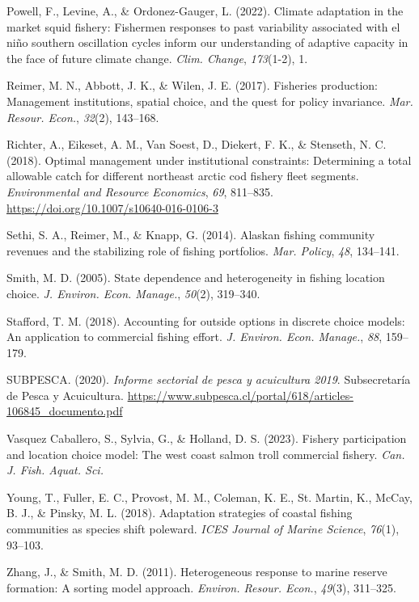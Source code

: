 \documentclass[
  11pt,
]{article}
\newlength{\cslhangindent}
\newenvironment{CSLReferences}[2] %
 {\begin{list}{}{%
  \setlength{\itemindent}{0pt}
  \setlength{\leftmargin}{0pt}
  \setlength{\parsep}{0pt}
  \ifodd #1
   \setlength{\leftmargin}{\cslhangindent}
   \setlength{\itemindent}{-1\cslhangindent}
  \fi
  \setlength{\itemsep}{#2\baselineskip}}}
 {\end{list}}
\begin{document}
\begin{CSLReferences}{1}{0}
Powell, F., Levine, A., \& Ordonez-Gauger, L. (2022). Climate adaptation
in the market squid fishery: Fishermen responses to past variability
associated with el niño southern oscillation cycles inform our
understanding of adaptive capacity in the face of future climate change.
\emph{Clim. Change}, \emph{173}(1-2), 1.

Reimer, M. N., Abbott, J. K., \& Wilen, J. E. (2017). Fisheries
production: Management institutions, spatial choice, and the quest for
policy invariance. \emph{Mar. Resour. Econ.}, \emph{32}(2), 143--168.

Richter, A., Eikeset, A. M., Van Soest, D., Diekert, F. K., \& Stenseth,
N. C. (2018). Optimal management under institutional constraints:
Determining a total allowable catch for different northeast arctic cod
fishery fleet segments. \emph{Environmental and Resource Economics},
\emph{69}, 811--835. \url{https://doi.org/10.1007/s10640-016-0106-3}

Sethi, S. A., Reimer, M., \& Knapp, G. (2014). Alaskan fishing community
revenues and the stabilizing role of fishing portfolios. \emph{Mar.
Policy}, \emph{48}, 134--141.

Smith, M. D. (2005). State dependence and heterogeneity in fishing
location choice. \emph{J. Environ. Econ. Manage.}, \emph{50}(2),
319--340.

Stafford, T. M. (2018). Accounting for outside options in discrete
choice models: An application to commercial fishing effort. \emph{J.
Environ. Econ. Manage.}, \emph{88}, 159--179.

SUBPESCA. (2020). \emph{Informe sectorial de pesca y acuicultura 2019}.
Subsecretaría de Pesca y Acuicultura.
\url{https://www.subpesca.cl/portal/618/articles-106845_documento.pdf}

Vasquez Caballero, S., Sylvia, G., \& Holland, D. S. (2023). Fishery
participation and location choice model: The west coast salmon troll
commercial fishery. \emph{Can. J. Fish. Aquat. Sci.}

Young, T., Fuller, E. C., Provost, M. M., Coleman, K. E., St. Martin,
K., McCay, B. J., \& Pinsky, M. L. (2018). Adaptation strategies of
coastal fishing communities as species shift poleward. \emph{ICES
Journal of Marine Science}, \emph{76}(1), 93--103.

Zhang, J., \& Smith, M. D. (2011). Heterogeneous response to marine
reserve formation: {A} sorting model approach. \emph{Environ. Resour.
Econ.}, \emph{49}(3), 311--325.

\end{CSLReferences}
\end{document}
